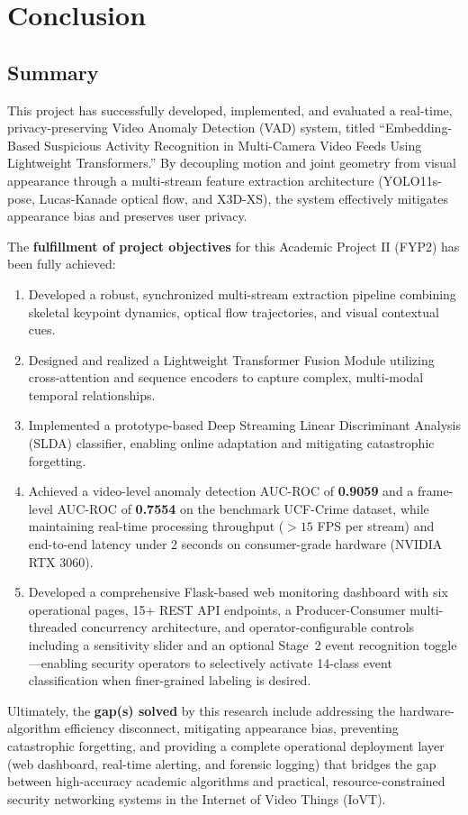 \documentclass[12pt]{article}
\begin{document}
\section{Conclusion}

\subsection{Summary}
This project has successfully developed, implemented, and evaluated a real-time, privacy-preserving Video Anomaly Detection (VAD) system, titled ``Embedding-Based Suspicious Activity Recognition in Multi-Camera Video Feeds Using Lightweight Transformers.'' By decoupling motion and joint geometry from visual appearance through a multi-stream feature extraction architecture (YOLO11s-pose, Lucas-Kanade optical flow, and X3D-XS), the system effectively mitigates appearance bias and preserves user privacy. 

The \textbf{fulfillment of project objectives} for this Academic Project II (FYP2) has been fully achieved:
\begin{enumerate}
    \item Developed a robust, synchronized multi-stream extraction pipeline combining skeletal keypoint dynamics, optical flow trajectories, and visual contextual cues.
    \item Designed and realized a Lightweight Transformer Fusion Module utilizing cross-attention and sequence encoders to capture complex, multi-modal temporal relationships.
    \item Implemented a prototype-based Deep Streaming Linear Discriminant Analysis (SLDA) classifier, enabling online adaptation and mitigating catastrophic forgetting.
    \item Achieved a video-level anomaly detection AUC-ROC of \textbf{0.9059} and a frame-level AUC-ROC of \textbf{0.7554} on the benchmark UCF-Crime dataset, while maintaining real-time processing throughput ($> 15$ FPS per stream) and end-to-end latency under 2 seconds on consumer-grade hardware (NVIDIA RTX 3060).
    \item Developed a comprehensive Flask-based web monitoring dashboard with six operational pages, 15+ REST API endpoints, a Producer-Consumer multi-threaded concurrency architecture, and operator-configurable controls including a sensitivity slider and an optional Stage~2 event recognition toggle---enabling security operators to selectively activate 14-class event classification when finer-grained labeling is desired.
\end{enumerate}
Ultimately, the \textbf{gap(s) solved} by this research include addressing the hardware-algorithm efficiency disconnect, mitigating appearance bias, preventing catastrophic forgetting, and providing a complete operational deployment layer (web dashboard, real-time alerting, and forensic logging) that bridges the gap between high-accuracy academic algorithms and practical, resource-constrained security networking systems in the Internet of Video Things (IoVT).

\clearpage


\end{document}
